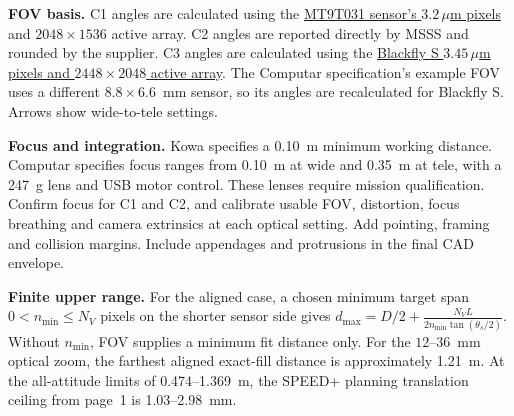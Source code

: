 \documentclass[10pt,a4paper,landscape]{article}
\begin{document}
\footnotesize
\textbf{FOV basis.} C1 angles are calculated using the \href{https://www.farnell.com/datasheets/1286418.pdf}{MT9T031 sensor's $3.2\,\mu$m pixels} and $2048\times1536$ active array. C2 angles are reported directly by MSSS and rounded by the supplier. C3 angles are calculated using the \href{https://softwareservices.flir.com/BFS-U3-51S5/latest/Model/spec.html}{Blackfly S $3.45\,\mu$m pixels and $2448\times2048$ active array}. The Computar specification's example FOV uses a different $8.8\times6.6$~mm sensor, so its angles are recalculated for Blackfly S. Arrows show wide-to-tele settings.\par
\smallskip
\textbf{Focus and integration.} Kowa specifies a 0.10~m minimum working distance. Computar specifies focus ranges from 0.10~m at wide and 0.35~m at tele, with a 247~g lens and USB motor control. These lenses require mission qualification. Confirm focus for C1 and C2, and calibrate usable FOV, distortion, focus breathing and camera extrinsics at each optical setting. Add pointing, framing and collision margins. Include appendages and protrusions in the final CAD envelope.\par
\smallskip
\textbf{Finite upper range.} For the aligned case, a chosen minimum target span $0<n_{\min}\le N_V$ pixels on the shorter sensor side gives
$\displaystyle d_{\max}=D/2+\frac{N_VL}{2n_{\min}\tan(\theta_s/2)}$.
Without $n_{\min}$, FOV supplies a minimum fit distance only. For the $12$--$36$~mm optical zoom, the farthest aligned exact-fill distance is approximately 1.21~m. At the all-attitude limits of 0.474--1.369~m, the SPEED+ planning translation ceiling from page~1 is 1.03--2.98~mm.
\end{document}

